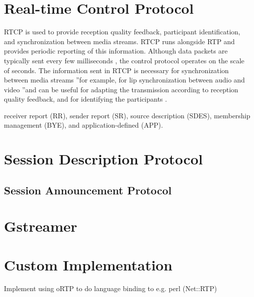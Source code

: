\cite{perkins2003rtp}
\section{Real-time Control Protocol}
RTCP is used to provide reception quality feedback, participant identification, and synchronization between media streams. RTCP runs alongside RTP and provides periodic reporting of this information. Although data packets are typically sent every few milliseconds , the control protocol operates on the scale of seconds. The information sent in RTCP is necessary for synchronization between media streams ”for example, for lip synchronization between audio and video ”and can be useful for adapting the transmission according to reception quality feedback, and for identifying the participants . 

receiver report (RR), sender report (SR), source description (SDES), membership management (BYE), and application-defined (APP). 

\section{Session Description Protocol}

\subsection{Session Announcement Protocol}


\section{Gstreamer}


\section{Custom Implementation}
Implement using oRTP to do language binding to e.g. perl (Net::RTP)